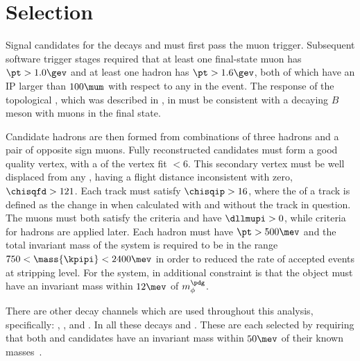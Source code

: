 \section{Selection}
\label{sec:hhh:sel}

Signal candidates for the decays \btokpipimumu and \btophikmumu must first pass the \lone muon
trigger.
Subsequent software trigger stages required that at least one final-state muon has $\pt>1.0\gev$
and at least one hadron has $\pt>1.6\gev$, both of which have an IP larger than $100\mum$ with
respect to any \PV in the event.
The response of the topological \BBDT, which was described in , in \hlttwo must
be consistent with a decaying $B$ meson with muons in the final state.


Candidate \Bp hadrons are then formed from combinations of three hadrons and a pair of opposite
sign muons.
Fully reconstructed candidates must form a good quality vertex, with a \chisq of the vertex fit
$<6$.
This secondary vertex must be well displaced from any \PV, having a flight distance inconsistent
with zero, $\chisqfd>121$.
Each track must satisfy $\chisqip>16$, where the \chisqip of a track is defined as the change in
\chisqip when calculated with and without the track in question.
The muons must both satisfy the \ismuon criteria and have $\dllmupi>0$,
while \pid criteria for hadrons are applied later.
Each hadron must have $\pt>500\mev$ and
the total invariant mass of the \kpipi system is required to be in the range
$750<\mass{\kpipi}<2400\mev$ in order to reduced the rate of accepted events at stripping level.
For the \phik system, in additional constraint is that the \decay{\phi}{\kk} object must have an
invariant mass within $12\mev$ of $m_\phi^\pdg$.

There are other decay channels which are used throughout this analysis, specifically:
\btojpsikpipi, \btopsitwosk, and \btojpsiphik.
In all these decays \psitwostojpsipipi and \jpsitomumu.
These are each selected by requiring that both \jpsi and \psitwos candidates have an invariant
mass within $50\mev$ of their known masses~\cite{PDG2012}.

